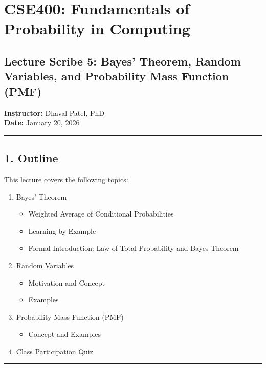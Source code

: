 \documentclass[12pt]{article}
\begin{document}
\section*{\textbf{CSE400: Fundamentals of Probability in Computing}}

\subsection*{\textbf{Lecture Scribe 5: Bayes’ Theorem, Random Variables, and Probability Mass Function (PMF)}}

\textbf{Instructor:} Dhaval Patel, PhD \\
\textbf{Date:} January 20, 2026

\hrule
\vspace{1em}

\subsection*{\textbf{1. Outline}}

This lecture covers the following topics:

\begin{enumerate}
    \item Bayes’ Theorem
    \begin{itemize}
        \item Weighted Average of Conditional Probabilities
        \item Learning by Example
        \item Formal Introduction: Law of Total Probability and Bayes Theorem
    \end{itemize}

    \item Random Variables
    \begin{itemize}
        \item Motivation and Concept
        \item Examples
    \end{itemize}

    \item Probability Mass Function (PMF)
    \begin{itemize}
        \item Concept and Examples
    \end{itemize}

    \item Class Participation Quiz
\end{enumerate}

\hrule
\vspace{1em}
\end{document}
